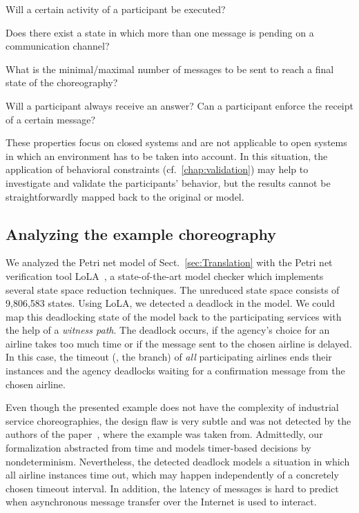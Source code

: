 \begin{niceitemize}
\item Will a certain activity of a participant be executed?

\item Does there exist a state in which more than one message is pending on a communication channel? 

\item What is the minimal/maximal number of messages to be sent to reach a final state of the choreography?

\item Will a participant always receive an answer? Can a participant enforce the receipt of a certain message?
\end{niceitemize}

These properties focus on closed systems and are not applicable to open systems in which an environment has to be taken into account. In this situation, the application of behavioral constraints (cf.~\autoref{chap:validation}) may help to investigate and validate the participants' behavior, but the results cannot be straightforwardly mapped back to the original  or \bpelchor{} model.




\subsection*{Analyzing the example choreography}

We analyzed the Petri net model of Sect.~\ref{sec:Translation} with the Petri net verification tool LoLA~\cite{Schmidt_2000_icatpn,Wolf_2007_icatpn}, a state-of-the-art model checker which implements several state space reduction techniques. The unreduced state space consists of 9{,}806{,}583 states. Using LoLA, we detected a deadlock in the model. We could map this deadlocking state of the model back to the participating services with the help of a \emph{witness path}. The deadlock occurs, if the agency's choice for an airline takes too much time or if the message sent to the chosen airline is delayed. In this case, the timeout (\ie, the  branch) of \emph{all} participating airlines ends their instances and the agency deadlocks waiting for a confirmation message from the chosen airline.

Even though the presented example does not have the complexity of industrial service choreographies, the design flaw is very subtle and was not detected by the authors of the paper~\cite{DeckerKLW_2007_icws}, where the example was taken from. Admittedly, our formalization abstracted from time and models timer-based decisions by nondeterminism. Nevertheless, the detected deadlock models a situation in which all airline instances time out, which may happen independently of a concretely chosen timeout interval. In addition, the latency of messages is hard to predict when asynchronous message transfer over the Internet is used to interact.




